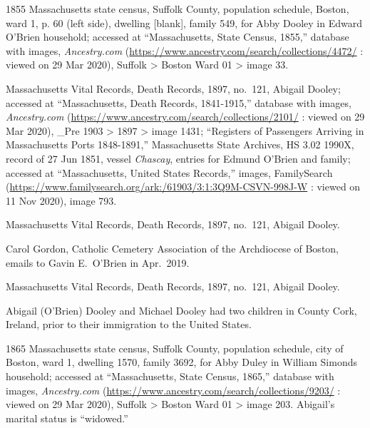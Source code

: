 \begin{thebibliography}{999}



1855 Massachusetts state census, Suffolk County, population schedule, Boston, ward 1, p. 60 (left side), dwelling [blank], family 549, for Abby Dooley in Edward O'Brien household; accessed at ``Massachusetts, State Census, 1855,'' database with images, \textit{Ancestry.com} (\url{https://www.ancestry.com/search/collections/4472/} : viewed on 29 Mar 2020), Suffolk > Boston Ward 01 > image 33.

Massachusetts Vital Records, Death Records, 1897, no.\ 121, Abigail Dooley; accessed at ``Massachusetts, Death Records, 1841-1915,'' database with images, \textit{Ancestry.com} (\url{https://www.ancestry.com/search/collections/2101/} : viewed on 29 Mar 2020), \_Pre 1903 > 1897 > image 1431; ``Registers of Passengers Arriving in Massachusetts Ports 1848-1891,'' Massachusetts State Archives, HS 3.02 1990X, record of 27 Jun 1851, vessel \textit{Chascay}, entries for Edmund O'Brien and family; accessed at ``Massachusetts, United States Records,'' images, FamilySearch (\url{https://www.familysearch.org/ark:/61903/3:1:3Q9M-CSVN-998J-W} : viewed on 11 Nov 2020), image 793.

Massachusetts Vital Records, Death Records, 1897, no.\ 121, Abigail Dooley.

Carol Gordon, Catholic Cemetery Association of the Archdiocese of Boston, emails to Gavin E.\ O'Brien in Apr.\ 2019.

Massachusetts Vital Records, Death Records, 1897, no.\ 121, Abigail Dooley.

Abigail (O'Brien) Dooley and Michael Dooley had two children in County Cork, Ireland, prior to their immigration to the United States. 

1865 Massachusetts state census, Suffolk County, population schedule, city of Boston, ward 1, dwelling 1570, family 3692, for Abby Duley in William Simonds household; accessed at ``Massachusetts, State Census, 1865,'' database with images, \textit{Ancestry.com} (\url{https://www.ancestry.com/search/collections/9203/} : viewed on 29 Mar 2020), Suffolk > Boston Ward 01 > image 203. Abigail's marital status is ``widowed.''


\end{thebibliography}
